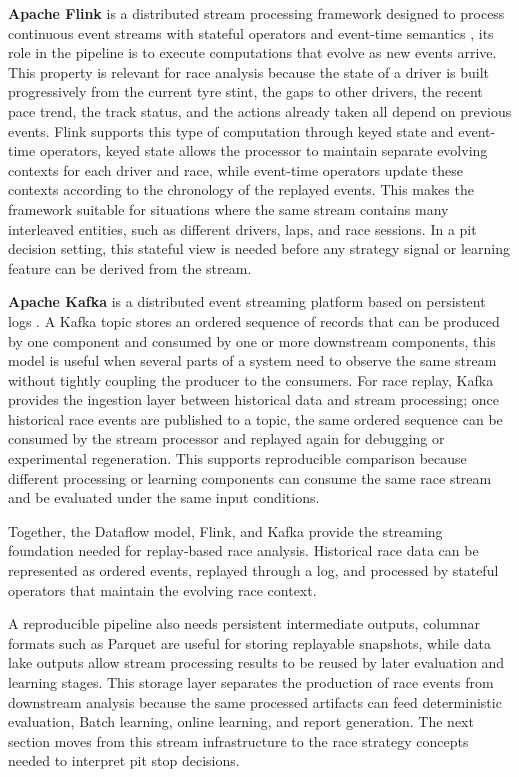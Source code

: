 \textbf{Apache Flink} is a distributed stream processing framework designed to process continuous event streams with stateful operators and event-time semantics
\citep{carbone2015flink}, its role in the pipeline is to execute computations that evolve as new events arrive.
This property is relevant for race analysis because the state of a driver is built progressively from the current tyre stint, the gaps to other drivers, the recent pace trend,
the track status, and the actions already taken all depend on previous events.
Flink supports this type of computation through keyed state and event-time operators, keyed state allows the processor to maintain separate evolving contexts for each
driver and race, while event-time operators update these contexts according to the chronology of the replayed events. This makes the framework suitable for situations where
the same stream contains many interleaved entities, such as different drivers, laps, and race sessions. In a pit decision setting, this stateful view is needed before any
strategy signal or learning feature can be derived from the stream.

\textbf{Apache Kafka} is a distributed event streaming platform based on persistent logs \citep{kreps2011kafka}. A Kafka topic stores an ordered sequence of records that can be produced
by one component and consumed by one or more downstream components, this model is useful when several parts of a system need to observe the same stream without tightly
coupling the producer to the consumers.
For race replay, Kafka provides the ingestion layer between historical data and stream processing; once historical race events are published to a topic, the same ordered
sequence can be consumed by the stream processor and replayed again for debugging or experimental regeneration. This supports reproducible comparison because different processing
or learning components can consume the same race stream and be evaluated under the same input conditions.

Together, the Dataflow model, Flink, and Kafka provide the streaming foundation needed for replay-based race analysis. Historical race data can be represented as ordered
events, replayed through a log, and processed by stateful operators that maintain the evolving race context.

A reproducible pipeline also needs persistent intermediate outputs, columnar formats such as Parquet are useful for storing replayable snapshots, while data lake outputs
allow stream processing results to be reused by later evaluation and learning stages. This storage layer separates the production of race events from downstream analysis because
the same processed artifacts can feed deterministic evaluation, Batch learning, online learning, and report generation.
The next section moves from this stream infrastructure to the race strategy concepts needed to interpret pit stop decisions.


